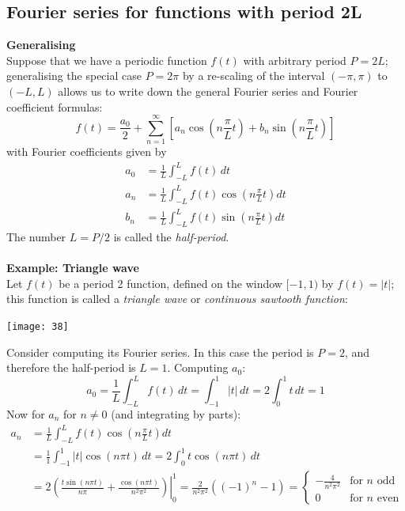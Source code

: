 \documentclass{report}
\begin{document}
\subsection{Fourier series for functions with period 2L}
\textbf{Generalising}\\
Suppose that we have a periodic function $f(t)$ with arbitrary period $P=2L$; generalising the special case
$P=2\pi$ by a re-scaling of the interval $(-\pi,\pi)$ to
$(-L,L)$ allows us to write down the general Fourier series and Fourier coefficient formulas:
\begin{equation*}
f(t)=\frac{a_0}{2}+\sum^\infty_{n=1}\left[a_n\cos\left(n\frac{\pi}{L}t\right)
+b_n\sin\left(n\frac{\pi}{L}t\right)\right]
\end{equation*}
with Fourier coefficients given by
\begin{align*}
a_0&=\frac{1}{L}\int^L_{-L}f(t)\,dt\\
a_n&=\frac{1}{L}\int^L_{-L}f(t)\cos\left(n\frac{\pi}{L}t\right)dt\\
b_n&=\frac{1}{L}\int^L_{-L}f(t)\sin\left(n\frac{\pi}{L}t\right)dt
\end{align*}
The number $L=P/2$ is called the \textit{half-period}.\\
\vspace{1mm}\\
\textbf{Example: Triangle wave}\\
Let $f(t)$ be a period 2 function, defined on the window $[-1,1)$ by $f(t)=|t|$; this function is called a 
\textit{triangle wave} or \textit{continuous sawtooth function}:
\begin{center}
\texttt{[image: 38]}\\
\end{center}
Consider computing its Fourier series. In this case the period is $P=2$, and therefore the half-period is $L=1$. 
Computing $a_0$:
\begin{equation*}
a_0=\frac{1}{L}\int^L_{-L}f(t)\,dt=\int^1_{-1}|t|\,dt
=2\int^1_{0}t\,dt=1
\end{equation*}
Now for $a_n$ for $n\neq0$ (and integrating by parts):
\begin{align*}
a_n&=\frac{1}{L}\int^L_{-L}f(t)\cos\left(n\frac{\pi}{L}t\right)dt\\
&=\frac{1}{1}\int^1_{-1}|t|\cos(n\pi t)\,dt=2\int^1_0t\cos(n\pi t)\,dt\\
&=2\left(\frac{t\sin(n\pi t)}{n\pi}+\left.\frac{\cos(n\pi t)}{n^2\pi^2}\right)\right|^1_0
=\frac{2}{n^2\pi^2}((-1)^n-1)=\begin{cases}
-\frac{4}{n^2\pi^2}&\text{for $n$ odd}\\
0&\text{for $n$ even}\end{cases}
\end{align*}
\end{document}
